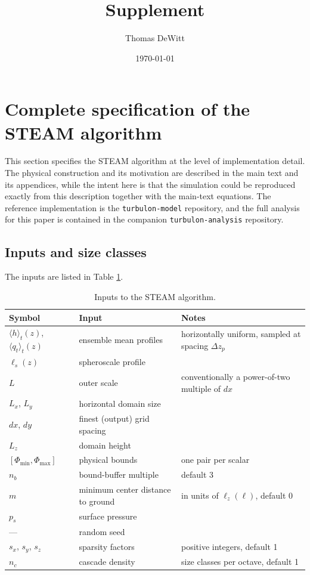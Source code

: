 \documentclass{article}
\title{Supplement}
\author{Thomas DeWitt}
\date{\today}
\begin{document}
\maketitle

\section{Complete specification of the STEAM algorithm}
\label{ssect:steam algorithm spec}

This section specifies the STEAM algorithm at the level of implementation
detail.
The physical construction and its motivation are described in the main
text and its appendices, while the intent here is that the simulation could be
reproduced exactly from this description together with the main-text
equations. The reference implementation is the \texttt{turbulon-model}
repository, and the full analysis for this paper is contained in the
companion \texttt{turbulon-analysis} repository.

\subsection{Inputs and size classes}

The inputs are listed in Table \ref{tab:steam inputs}.

\begin{table}[t]
\centering
\small
\begin{tabular}{lll}
\hline
Symbol & Input & Notes \\
\hline
$\langle h \rangle_t(z)$, $\langle q_t \rangle_t(z)$ & ensemble mean profiles & horizontally uniform, sampled at spacing $\Delta z_p$ \\
$\ell_s(z)$ & spheroscale profile & \\
$L$ & outer scale & conventionally a power-of-two multiple of $dx$ \\
$L_x$, $L_y$ & horizontal domain size & \\
$dx$, $dy$ & finest (output) grid spacing & \\
$L_z$ & domain height & \\
$[\Phi_{\min}, \Phi_{\max}]$ & physical bounds & one pair per scalar \\
$n_b$ & bound-buffer multiple & default 3 \\
$m$ & minimum center distance to ground & in units of $\ell_z(\ell)$, default 0 \\
$p_s$ & surface pressure & \\
--- & random seed & \\
$s_x$, $s_y$, $s_z$ & sparsity factors & positive integers, default 1 \\
$n_c$ & cascade density & size classes per octave, default 1 \\
\hline
\end{tabular}
\caption{Inputs to the STEAM algorithm.}\label{tab:steam inputs}
\end{table}
\end{document}

